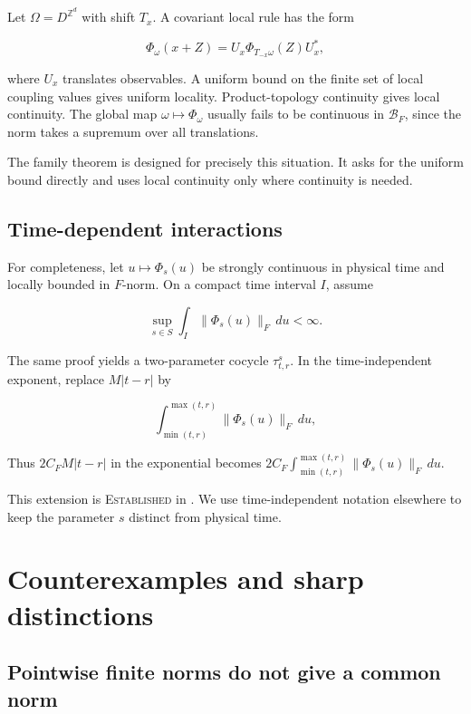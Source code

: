 \documentclass[12pt]{article}
\theoremstyle{definition}
\theoremstyle{remark}
\newcommand{\EST}{\textsc{Established}}
\begin{document}
Let $\Omega=D^{\mathbb Z^d}$ with shift $T_x$.  A covariant local rule has the
form

\begin{equation}
  \Phi_\omega(x+Z)=U_x\Phi_{T_{-x}\omega}(Z)U_x^*,
\end{equation}

where $U_x$ translates observables.  A uniform bound on the finite set of
local coupling values gives uniform locality.  Product-topology continuity
gives local continuity.  The global map
$\omega\mapsto\Phi_\omega$ usually fails to be continuous in
$\mathcal B_F$, since the norm takes a supremum over all translations.

The family theorem is designed for precisely this situation.  It asks for the
uniform bound directly and uses local continuity only where continuity is
needed.

\subsection{Time-dependent interactions}

For completeness, let $u\mapsto\Phi_s(u)$ be strongly continuous in physical
time and locally bounded in $F$-norm.  On a compact time interval $I$, assume

\begin{equation}
  \sup_{s\in S}\int_I\|\Phi_s(u)\|_F\,du<\infty.
\end{equation}

The same proof yields a two-parameter cocycle $\tau^s_{t,r}$.  In the
time-independent exponent, replace $M|t-r|$ by

\begin{equation}
  \int_{\min(t,r)}^{\max(t,r)}\|\Phi_s(u)\|_F\,du,
\end{equation}

Thus $2C_FM|t-r|$ in the exponential becomes
$2C_F\int_{\min(t,r)}^{\max(t,r)}\|\Phi_s(u)\|_F\,du$.

This extension is \EST{} in \cite{NSY2019}.  We use time-independent
notation elsewhere to keep the parameter $s$ distinct from physical time.

\section{Counterexamples and sharp distinctions}

\subsection{Pointwise finite norms do not give a common norm}
\end{document}

